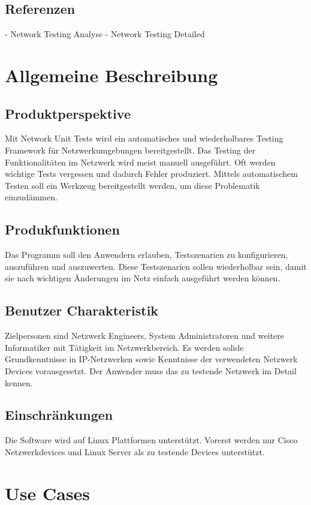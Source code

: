 \documentclass[a4,12pt]{scrartcl}
\begin{document}
\subsection{Referenzen}
- Network Testing Analyse
- Network Testing Detailed

\newpage
\section{Allgemeine Beschreibung}
\subsection{Produktperspektive}
Mit Network Unit Tests wird ein automatisches und wiederholbares Testing Framework für Netzwerkumgebungen bereitgestellt. Das Testing der Funktionalitäten im Netzwerk wird meist manuell ausgeführt. Oft werden wichtige Tests vergessen und dadurch Fehler produziert. Mittels automatischem Testen soll ein Werkzeug bereitgestellt werden, um diese Problematik einzudämmen.
\subsection{Produkfunktionen}
Das Programm soll den Anwendern erlauben, Testszenarien zu konfigurieren, auszuführen und auszuwerten. Diese Testszenarien sollen wiederholbar sein, damit sie nach wichtigen Änderungen im Netz einfach ausgeführt werden können.
\subsection{Benutzer Charakteristik}
Zielpersonen sind Netzwerk Engineers, System Administratoren und weitere Informatiker mit Tätigkeit im Netzwerkbereich. Es werden solide Grundkenntnisse in IP-Netzwerken sowie Kenntnisse der verwendeten Netzwerk Devices vorausgesetzt. Der Anwender muss das zu testende Netzwerk im Detail kennen. 
\subsection{Einschränkungen}
Die Software wird auf Linux Plattformen unterstützt. Vorerst werden nur Cisco Netzwerkdevices und Linux Server als zu testende Devices unterstützt.
\newpage
\section{Use Cases}
\end{document}
